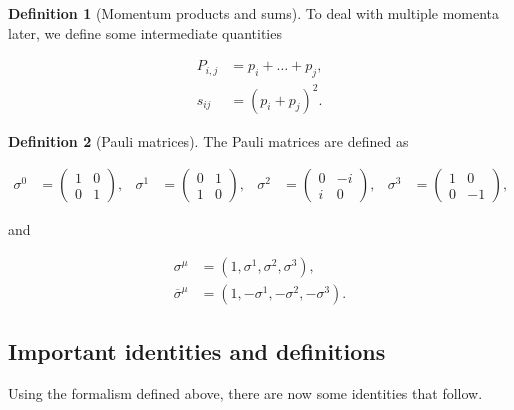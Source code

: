 \documentclass{article}
\theoremstyle{definition}
\newtheorem{definition}{Definition}[section]
\numberwithin{equation}{section}
\begin{document}
\begin{definition}[Momentum products and sums]

To deal with multiple momenta later, we define some intermediate quantities

\begin{align}
     P_{i,j} &= p_i + \dots + p_j, \\
     s_{ij} &= \left( p_i + p_j \right)^2.
\end{align}

\end{definition}

\begin{definition}[Pauli matrices]

The Pauli matrices are defined as

\begin{align*}
    \sigma^0 &= 
    \begin{pmatrix}
        1 & 0 \\
        0 & 1
    \end{pmatrix}, &
    \sigma^1 &= 
    \begin{pmatrix}
        0 & 1 \\
        1 & 0
    \end{pmatrix}, &
    \sigma^2 &= 
    \begin{pmatrix}
        0 & -i \\
        i & 0
    \end{pmatrix}, &
    \sigma^3 &= 
    \begin{pmatrix}
        1 & 0 \\
        0 & -1
    \end{pmatrix},
\end{align*}

and

\begin{align*}
    \sigma^{\mu} &= (1, \sigma^1, \sigma^2, \sigma^3), \\
    \overline{\sigma}^{\mu} &= (1, -\sigma^1, -\sigma^2, -\sigma^3).
\end{align*}

\end{definition}

\subsection{Important identities and definitions}

Using the formalism defined above, there are now some identities that follow.
\end{document}

